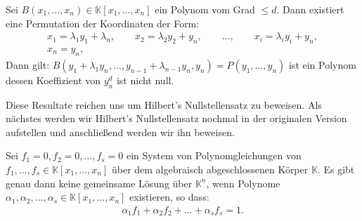 \begin{lemma} \label{lemma}
Sei $B(x_1,\ldots,x_n)\in \mathbb{K}[x_1,\ldots,x_n]$ ein Polynom vom Grad $\le d$. Dann existiert eine Permutation der Koordinaten der Form:
\begin{align*}
x_1 = \lambda_1y_1+\lambda_n, \qquad x_2 = \lambda_2y_2 + y_n, \qquad \ldots, \qquad x_i = \lambda_iy_i+y_n, \\
x_n = y_n,
\end{align*}
Dann gilt: $B(y_1+\lambda_1y_n,\ldots,y_{n-1}+\lambda_{n-1}y_n,y_n) = P(y_1,\ldots,y_n)$ ist ein Polynom dessen Koeffizient von $y_n^d$ ist nicht null.
\end{lemma}

\noindent Diese Resultate reichen uns um Hilbert's Nullstellensatz zu beweisen. Als nächstes werden wir Hilbert's Nullstellensatz nochmal in der originalen Version aufstellen und anschließend werden wir ihn beweisen.

\begin{theorem}
Sei $f_1 = 0, f_2 = 0, \ldots, f_s = 0$ ein System von Polynomgleichungen von $f_1,\ldots,f_s \in \mathbb{K}[x_1,\ldots,x_n]$ über dem algebraisch abgeschlossenen Körper $\mathbb{K}$. Es gibt genau dann keine gemeinsame Lösung über $\mathbb{K}^n$, wenn Polynome $\alpha_1,\alpha_2,\ldots,\alpha_s \in \mathbb{K}[x_1,\ldots,x_n]$ existieren, so dass:
\begin{align*}
\alpha_1f_1 + \alpha_2f_2+ \ldots + \alpha_sf_s = 1.
\end{align*}
\end{theorem}

